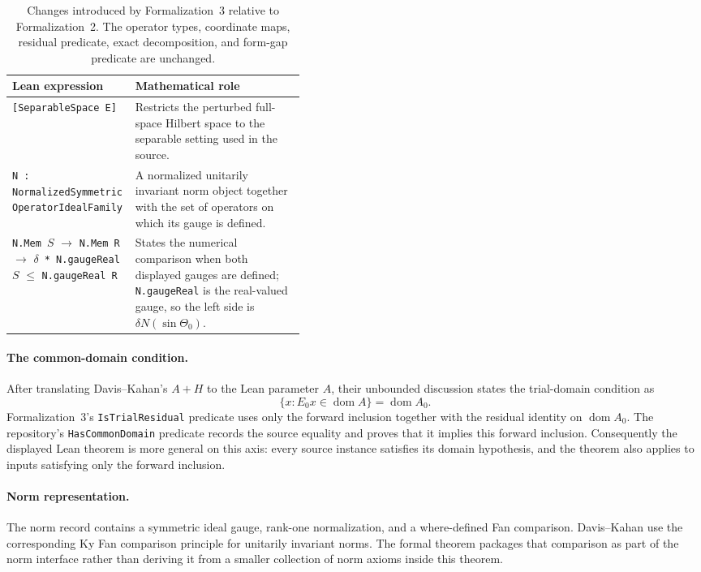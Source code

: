 \begin{table}[H]
\centering
\small
\caption{Changes introduced by Formalization~3 relative to Formalization~2.
The operator types, coordinate maps, residual predicate, exact decomposition,
and form-gap predicate are unchanged.}
\label{tab:formalization3-glossary}
\begin{tabularx}{\linewidth}{@{}>{\raggedright\arraybackslash}p{0.42\linewidth}>{\raggedright\arraybackslash}X@{}}
\toprule
Lean expression & Mathematical role \\
\midrule
\texttt{[SeparableSpace E]}
  & Restricts the perturbed full-space Hilbert space to the separable setting
    used in the source. \\
\texttt{N : NormalizedSymmetric}\newline
\texttt{OperatorIdealFamily}
  & A normalized unitarily invariant norm object together with the set of
    operators on which its gauge is defined. \\
\texttt{N.Mem }$S$ $\to$ \texttt{N.Mem R} $\to$\newline
$\delta$\texttt{ * N.gaugeReal }$S$ $\le$ \texttt{N.gaugeReal R}
  & States the numerical comparison when both displayed gauges are defined;
    \texttt{N.gaugeReal} is the real-valued gauge, so the left side is
    $\delta N(\sin\Theta_0)$. \\
\bottomrule
\end{tabularx}
\end{table}

\paragraph{The common-domain condition.}
After translating Davis--Kahan's $A+H$ to the Lean parameter $A$, their
unbounded discussion states the trial-domain condition as
\[
  \{x:E_0x\in\operatorname{dom}A\}=\operatorname{dom}A_0.
\]
Formalization~3's \texttt{IsTrialResidual} predicate uses only the forward
inclusion together with the residual identity on $\operatorname{dom}A_0$.
The repository's \texttt{HasCommonDomain} predicate records the source equality
and proves that it implies this forward inclusion.  Consequently the displayed
Lean theorem is more general on this axis: every source instance satisfies its
domain hypothesis, and the theorem also applies to inputs satisfying only the
forward inclusion.

\paragraph{Norm representation.}
The norm record contains a symmetric ideal gauge, rank-one normalization, and a
where-defined Fan comparison.  Davis--Kahan use the corresponding Ky Fan
comparison principle for unitarily invariant norms.  The formal theorem packages
that comparison as part of the norm interface rather than deriving it from a
smaller collection of norm axioms inside this theorem.

